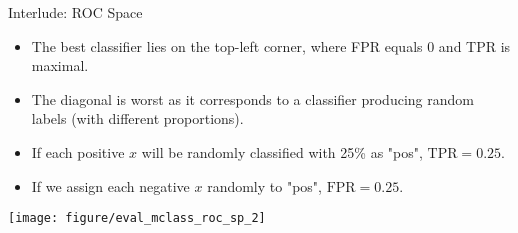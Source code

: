 \documentclass[11pt,compress,t,notes=noshow, xcolor=table]{beamer}
\begin{document}
\begin{vbframe}{Interlude: ROC Space}
	
	\begin{itemize}
		\item The best classifier lies on the top-left corner, where FPR equals 0 and 
		TPR is maximal.
		\item The diagonal is worst as it corresponds to a classifier producing random 
		labels (with different proportions). 
	\end{itemize}
	
	\lz
	
	\begin{minipage}[c]{0.5\textwidth}
		\begin{itemize}
			\item If each positive $x$ will be randomly classified 
			with 25\% as "pos", $\text{TPR} = 0.25$.
			\item If we assign each negative $x$ randomly to "pos", $\text{FPR} = 0.25$.

		\end{itemize}
	\end{minipage}%
	\begin{minipage}[c]{0.5\textwidth}
		\centering \texttt{[image: figure/eval\_mclass\_roc\_sp\_2]}
	\end{minipage}
	
\end{vbframe}
\end{document}
